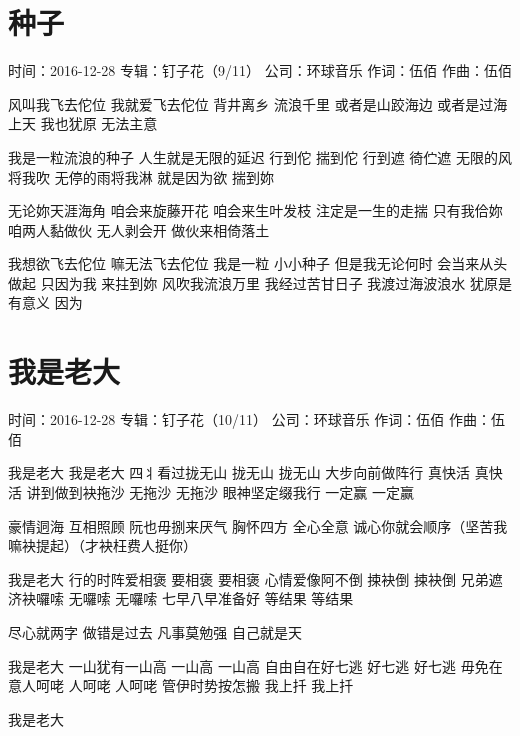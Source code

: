 \documentclass[UTF8,a4paper,oneside,twocolumn,12pt]{ctexbook}
\newcommand{\infopair}[2]{\textbullet #1：#2}
\newcommand{\zc}[1][伍佰]{\infopair{作词}{#1}}
\newcommand{\zq}[1][伍佰]{\infopair{作曲}{#1}}
\newcommand{\zj}[1]{\infopair{专辑}{#1}}
\newcommand{\sj}[1]{\infopair{时间}{#1}}
\newcommand{\gs}[1]{\infopair{公司}{#1}}
\newenvironment{info}{\begin{flushleft}\kaishu
	}
	{\end{flushleft}\normalsize\yahei\par}
\newenvironment{lyric}{
	}
{}
\begin{document}
\section{种子}
\begin{info}
	\sj{2016-12-28}
	\zj{钉子花（9/11）}
	\gs{环球音乐}
	\zc
	\zq
\end{info}
\begin{lyric}
	风叫我飞去佗位 我就爱飞去佗位
	背井离乡 流浪千里
	或者是山跤海边 或者是过海上天
	我也犹原 无法主意

	我是一粒流浪的种子 人生就是无限的延迟
	行到佗 揣到佗 行到遮 徛伫遮
	无限的风将我吹 无停的雨将我淋
	就是因为欲 揣到妳

	无论妳天涯海角
	咱会来旋藤开花 咱会来生叶发枝
	注定是一生的走揣
	只有我佮妳 咱两人黏做伙 无人剥会开
	做伙来相倚落土

	我想欲飞去佗位 嘛无法飞去佗位
	我是一粒 小小种子
	但是我无论何时 会当来从头做起
	只因为我 来拄到妳
	风吹我流浪万里
	我经过苦甘日子 我渡过海波浪水
	犹原是有意义 因为
\end{lyric}

\section{我是老大}
\begin{info}
	\sj{2016-12-28}
	\zj{钉子花（10/11）}
	\gs{环球音乐}
	\zc
	\zq
\end{info}
\begin{lyric}
	我是老大 我是老大
	四丬看过拢无山 拢无山 拢无山
	大步向前做阵行 真快活 真快活
	讲到做到袂拖沙 无拖沙 无拖沙
	眼神坚定缀我行 一定赢 一定赢

	豪情迵海 互相照顾
	阮也毋捌来厌气
	胸怀四方 全心全意
	诚心你就会顺序（坚苦我嘛袂提起）（才袂枉费人挺你）

	我是老大
	行的时阵爱相褒 要相褒 要相褒
	心情爱像阿不倒 捒袂倒 捒袂倒
	兄弟遮济袂囉嗦 无囉嗦 无囉嗦
	七早八早准备好 等结果 等结果

	尽心就两字 做错是过去
	凡事莫勉强 自己就是天

	我是老大
	一山犹有一山高 一山高 一山高
	自由自在好七逃 好七逃 好七逃
	毋免在意人呵咾 人呵咾 人呵咾
	管伊时势按怎搬 我上扦 我上扦

	我是老大
\end{lyric}
\end{document}
